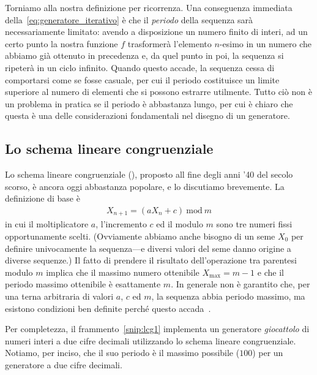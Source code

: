 Torniamo alla nostra definizione per ricorrenza. Una conseguenza immediata
della~\eqref{eq:generatore_iterativo} è che il \emph{periodo} della sequenza
sarà necessariamente limitato: avendo a disposizione un numero finito di
interi, ad un certo punto la nostra funzione $f$ trasformerà l'elemento
$n$-esimo in un numero che abbiamo già ottenuto in precedenza e, da quel
punto in poi, la sequenza si ripeterà in un ciclo infinito. Quando questo
accade, la sequenza cessa di comportarsi come se fosse casuale, per cui il
periodo costituisce un limite superiore al numero di elementi che si possono
estrarre utilmente. Tutto ciò non è un problema in pratica se il periodo
è abbastanza lungo, per cui è chiaro che questa è una delle considerazioni
fondamentali nel disegno di un generatore.


\subsection{Lo schema lineare congruenziale}

Lo schema lineare congruenziale (),
proposto all fine degli anni '40 del secolo scorso, è ancora oggi
abbastanza popolare, e lo discutiamo brevemente. La definizione di base è
\begin{align}
  X_{n + 1} = (a X_n + c)~\text{mod}~m
\end{align}
in cui il moltiplicatore $a$, l'incremento $c$ ed il modulo $m$ sono
tre numeri fissi opportunamente scelti. (Ovviamente abbiamo anche bisogno di
un seme $X_0$ per definire univocamente la sequenza---e diversi valori del
seme danno origine a diverse sequenze.) Il fatto di prendere il risultato
dell'operazione tra parentesi modulo $m$ implica che il massimo numero
ottenibile $X_\text{max} = m - 1$ e che il periodo massimo ottenibile è
esattamente $m$. In generale non è garantito che, per una terna arbitraria
di valori $a$, $c$ ed $m$, la sequenza abbia periodo massimo, ma esistono
condizioni ben definite perché questo accada~\cite{taocp2}.

\begin{snippet}[htb!]
  \bigskip %
\end{snippet}

Per completezza, il frammento~\ref{snip:lcg1} implementa un generatore
\emph{giocattolo} di numeri interi a due cifre decimali utilizzando lo schema
lineare congruenziale. Notiamo, per inciso, che il suo periodo è il massimo
possibile ($100$) per un generatore a due cifre decimali.

